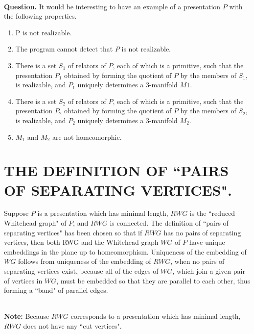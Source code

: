 \documentclass[12pt]{amsart}
\newcommand{\note}{\ \\ \noindent  \textbf{Note:} }
\newcommand{\question}{\ \\ \noindent \textbf{Question.} }
\begin{document}
\question   It would be interesting to have an example of a presentation $P$ with the
    following properties.
   \begin{enumerate}
            \item     P is not realizable.
            \item      The program cannot detect that $P$ is not realizable.
             \item      There is a set $S_1$ of relators of $P$, each of which is a primitive, such that the
                        presentation $P_1$ obtained by forming the quotient of $P$ by the members of $S_1$, is
                        realizable, and $P_1$ uniquely determines a 3-manifold $M1 $.
               \item      There is a set $S_2$ of relators of $P$, each of which is a primitive, such that the
                        presentation $P_2$ obtained by forming the quotient of $P$ by the members of $S_2$, is
                        realizable, and $P_2$ uniquely determines a 3-manifold $M_2$.
                \item      $M_1$ and $M_2$ are not homeomorphic.                           
                
     \end{enumerate}                                   

                                        
  \section{THE DEFINITION OF  ``PAIRS OF SEPARATING VERTICES".}

        
                Suppose $P$ is a presentation which has minimal length, $RWG$ is the  ``reduced
        Whitehead graph" of $P$, and $RWG$ is connected. The definition of  ``pairs of separating
        vertices" has been chosen so that if $RWG$ has no pairs of separating vertices, then both
        RWG and the Whitehead graph $WG$ of $P$ have unique embeddings in the plane up to
        homeomorphism. Uniqueness of the embedding of $WG$ follows from uniqueness of the embedding
        of $RWG$, when no pairs of separating vertices exist, because all of the edges of $WG$, which
        join a given pair of vertices in $WG$, must be embedded so that they are parallel to each
        other, thus forming a  ``band" of parallel edges.
        
        \note   Because $RWG$ corresponds to a presentation which has minimal length, $RWG$ does not
        have any  ``cut vertices".
        
\end{document}

